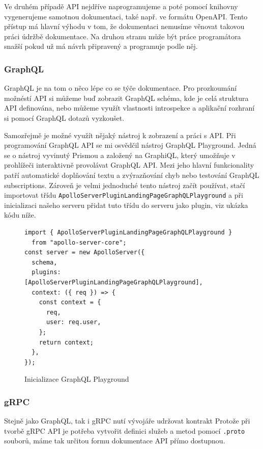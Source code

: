 \documentclass[thesis=M,czech]{FITthesis}[2019/12/23]
\begin{document}
Ve druhém případě API nejdříve naprogramujeme a poté pomocí knihovny vygenerujeme samotnou dokumentaci, také např. ve formátu OpenAPI. Tento přístup má hlavní výhodu v tom, že dokumentaci nemusíme věnovat takovou práci údržbě dokumentace. Na druhou stranu může být práce programátora snažší pokud už má návrh připravený a programuje podle něj.

\subsubsection*{GraphQL}
GraphQL je na tom o něco lépe co se týče dokumentace. Pro prozkoumání možnéstí API si můžeme buď zobrazit GraphQL schéma, kde je celá struktura API definována, nebo můžeme využít vlastnosti introspekce a aplikační rozhraní si pomocí GraphQL dotazů vyzkoušet.

Samozřejmě je možné využít nějaký nástroj k zobrazení a práci s API. Při programování GraphQL API se mi osvědčil nástroj GraphQL Playground. %
Jedná se o nástroj vyvinutý Prismou a založený na GraphiQL, který umožňuje v prohlížeči interaktivně provolávat GraphQL API. Mezi jeho hlavní funkcionality patří automatické doplňování textu a zvýrazňování chyb nebo testování GraphQL subscriptions. Zároveň je velmi jednoduché tento nástroj začít používat, stačí importovat třídu \texttt{ApolloServerPluginLandingPageGraphQLPlayground} a při inicializaci našeho serveru přidat tuto třídu do serveru jako plugin, viz ukázka kódu níže.

\begin{figure}[H]
\begin{verbatim}
import { ApolloServerPluginLandingPageGraphQLPlayground }
  from "apollo-server-core";
const server = new ApolloServer({
  schema,
  plugins: [ApolloServerPluginLandingPageGraphQLPlayground],
  context: ({ req }) => {
    const context = {
      req,
      user: req.user,
    };
    return context;
  },
});

\end{verbatim}
\caption{Inicializace GraphQL Playground}
\end{figure}

\subsubsection*{gRPC}
Stejně jako GraphQL, tak i gRPC nutí vývojáře udržovat kontrakt 
Protože při tvorbě gRPC API je potřeba vytvořit definici služeb a metod pomocí \texttt{.proto} souborů, máme tak určitou formu dokumentace API přímo dostupnou.
\end{document}
